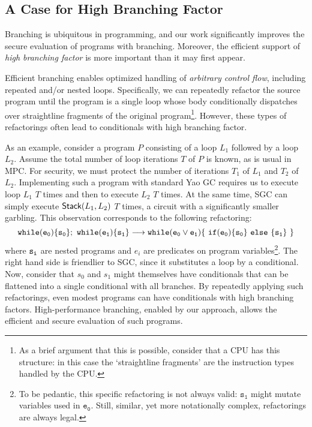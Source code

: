 \subsection{A Case for High Branching Factor}
\label{sec:motivationHighB}

Branching is ubiquitous in programming, and our work significantly
improves the secure evaluation of programs with branching.
Moreover, the efficient support of \emph{high branching factor}
is more important than it may first appear.

Efficient branching
enables optimized handling of \emph{arbitrary
control flow}, including repeated and/or nested loops.
%
Specifically, we can repeatedly refactor the source program
until the program is a single loop whose body conditionally dispatches
over straightline fragments of the original program\footnote{%
  As a brief argument that this is possible, consider that a
  CPU has this structure: in this case the `straightline
  fragments' are the instruction types handled by the CPU.
}.
However, these types of refactorings often lead to conditionals with
high branching factor.

As an example,
consider a program $P$ consisting of a loop $L_1$ followed by a loop
$L_2$.  Assume the total number of loop iterations $T$ of $P$ is
known, as is usual in MPC.
For security, we must protect the number of iterations $T_1$ of $L_1$
and $T_2$ of $L_2$.
Implementing such a program with standard Yao GC requires us to
execute loop $L_1$ $T$ times and then to execute $L_2$ $T$ times.
At the same time, SGC can simply execute  $\textsf{Stack}(L_1, L_2)$ $T$
times, a circuit with a significantly smaller garbling. This observation corresponds to the
following refactoring:
\[{\tt while (e_0) \{ s_0 \} ; \ while (e_1) \{ s_1 \}}
\longrightarrow {\tt while (e_0 \lor e_1) \{\ if  (e_0) \{s_0\}\  else\  \{s_1\}\ \}} \]
where ${\tt s_i}$ are nested programs and $e_i$ are predicates on program
variables\footnote{%
  To be pedantic, this specific refactoring is not always
  valid: $\mathtt{s_1}$ might mutate variables used in
  $\mathtt{e_0}$. Still, similar, yet more notationally complex,
  refactorings are always legal.
}.
The right hand side is friendlier to SGC, since it
substitutes a loop by a conditional.
Now, consider that $s_0$ and $s_1$ might themselves have conditionals
that can be flattened into a single conditional with all branches.
By repeatedly applying such refactorings, even modest
programs can have conditionals with high branching factors.
High-performance branching, enabled by our approach, allows the
efficient and secure evaluation of such programs.


